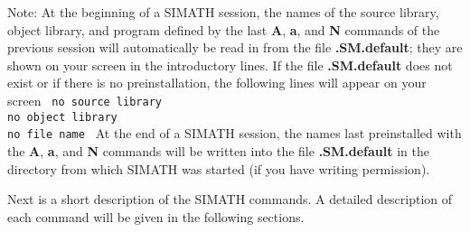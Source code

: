 Note: At the beginning of a SIMATH session, the names of the source library, object 
library, and program defined by the last {\bf A}, {\bf a}, and {\bf N} commands of
the previous session will automatically be read in from the file {\bf .SM.default};
they are shown on your screen in the introductory lines.  If the file {\bf .SM.default}
does not exist or if there is no preinstallation, the following lines will appear on 
your screen
\leer
{\tt
no source library\\  
no object library\\
no file name
}
\leer
At the end of a SIMATH session, the names last preinstalled with the {\bf A}, {\bf a},
and {\bf N} commands will be written into the file {\bf .SM.default} in the directory
from which SIMATH was started (if you have writing permission).

Next is a short description of the SIMATH commands. A detailed description of each command
will be given in the following sections.

